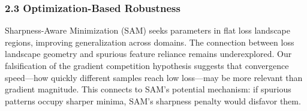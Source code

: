 \subsubsection{2.3 Optimization-Based Robustness}

Sharpness-Aware Minimization (SAM) seeks parameters in flat loss landscape regions, improving generalization across domains. The connection between loss landscape geometry and spurious feature reliance remains underexplored. Our falsification of the gradient competition hypothesis suggests that convergence speed---how quickly different samples reach low loss---may be more relevant than gradient magnitude. This connects to SAM's potential mechanism: if spurious patterns occupy sharper minima, SAM's sharpness penalty would disfavor them.
